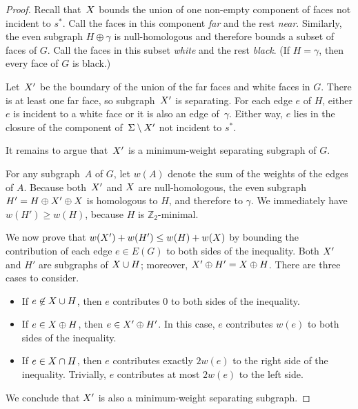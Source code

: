 \documentclass[letterpaper,review]{siamart190516}
\def\Z{\mathbb{Z}}
\def\rnote#1{\color{red}Review: #1 \color{black}}
\def\knote#1{\textcolor{olive}{Kyle: #1}}
\begin{document}
{\begin{proof}
Recall that~$X$ bounds the union of one non-empty component of faces not incident to
$s^*$.
Call the faces in this component \emph{far} and the rest \emph{near}.
Similarly, the even subgraph $H \oplus \gamma$ is null-homologous and therefore bounds a subset of
faces of $G$.
Call the faces in this subset \emph{white} and the rest \emph{black}.
(If $H = \gamma$, then every face of $G$ is black.)

Let~$X'$ be the boundary of the union of the far faces and white faces in $G$.
There is at least one far face, so subgraph~$X'$ is separating.
For each edge \(e\) of \(H\), either \(e\) is incident to a white face or it is also an edge
of~\(\gamma\).
Either way, \(e\) lies in the closure of the component of~$\Sigma \setminus X'$ not
incident to $s^*$.

It remains to argue that~$X'$ is a minimum-weight separating subgraph of $G$.

For any subgraph~$A$ of $G$, let $w(A)$ denote the sum of the weights of the edges of $A$. Because both~$X'$ and $X$ are null-homologous, the even subgraph $H' = H \oplus X' \oplus X$ is homologous to $H$, and therefore to $\gamma$.  We immediately have $w(H') \ge w(H)$, because $H$ is $\Z_2$-minimal.

  We now prove that $w(X') + w(H') \leq w(H) + w(X)$ by bounding the contribution of each edge $e \in E(G)$ to both sides of the inequality.  Both $X'$ and $H'$ are subgraphs of $X\cup H$; moreover, $X' \oplus H' = X \oplus H$.  There are three cases to consider.
\begin{itemize}
\item
If $e \not\in X\cup H$, then $e$ contributes $0$ to both sides of the inequality.
\item
If $e \in X \oplus H$, then $e \in X' \oplus H'$.  In this case, $e$ contributes $w(e)$ to both sides of the inequality.
\item
If $e \in X \cap H$, then $e$ contributes exactly $2w(e)$ to the right side of the inequality.  Trivially, $e$ contributes at most $2w(e)$ to the left side.
\end{itemize}
We conclude that $X'$ is also a minimum-weight separating subgraph.
\end{proof}

}
\end{document}
